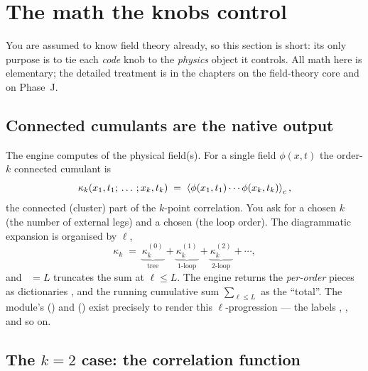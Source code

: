 \section{The math the knobs control}

You are assumed to know \msrjd{} field theory already, so this section is short:
its only purpose is to tie each \emph{code} knob to the \emph{physics} object it
controls. All math here is elementary; the detailed treatment is in the chapters
on the field-theory core and on Phase~J.

\subsection{Connected cumulants are the native output}

The engine computes  of the physical
field(s). For a single field $\phi(x,t)$ the order-$k$ connected cumulant is
\begin{equation}
  \kappa_k(x_1,t_1;\,\ldots\,;x_k,t_k)
  \;=\; \left\langle \phi(x_1,t_1)\cdots\phi(x_k,t_k) \right\rangle_c ,
\end{equation}
the connected (cluster) part of the $k$-point correlation. You ask for a chosen
$k$ (the number of external legs) and a chosen  (the loop order).
The diagrammatic expansion is organised by  $\ell$,
\begin{equation}
  \kappa_k \;=\; \underbrace{\kappa_k^{(0)}}_{\text{tree}}
              + \underbrace{\kappa_k^{(1)}}_{\text{1-loop}}
              + \underbrace{\kappa_k^{(2)}}_{\text{2-loop}}
              + \cdots,
\end{equation}
and ~$=L$ truncates the sum at $\ell\le L$. The engine
returns the \emph{per-order} pieces as  dictionaries
, and the running cumulative sum
$\sum_{\ell\le L}$ as the ``total''. The module's
 () and
 () exist precisely to render
this $\ell$-progression --- the labels , , and so
on.

\subsection{The \texorpdfstring{$k=2$}{k=2} case: the correlation function}

